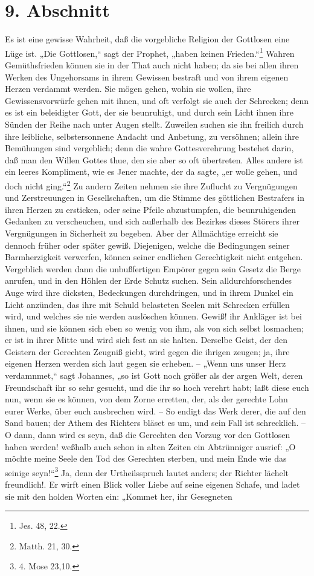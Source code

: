 \section{9. Abschnitt}

Es ist eine gewisse Wahrheit, daß die vorgebliche Religion der Gottlosen eine Lüge ist. „Die Gottlosen,“ sagt der Prophet, „haben keinen Frieden.“\footnote{Jes. 48, 22.} Wahren Gemüthsfrieden können sie in der That auch nicht haben; da sie bei allen ihren Werken des Ungehorsams in ihrem Gewissen bestraft und von ihrem eigenen Herzen verdammt werden. Sie mögen gehen, wohin sie wollen, ihre Gewissensvorwürfe gehen mit ihnen, und oft verfolgt sie auch der Schrecken; denn es ist ein beleidigter Gott, der sie beunruhigt, und durch sein Licht ihnen ihre Sünden der Reihe nach unter Augen stellt. Zuweilen suchen sie ihn freilich durch ihre leibliche, selbstersonnene Andacht und Anbetung, zu versöhnen; allein ihre Bemühungen sind vergeblich; denn die wahre Gottesverehrung bestehet darin, daß man den Willen Gottes thue, den sie aber so oft übertreten. Alles andere ist ein leeres Kompliment, wie es Jener machte, der da sagte, „er wolle gehen, und doch nicht ging.“\footnote{Matth. 21, 30.} Zu andern Zeiten nehmen sie ihre Zuflucht zu Vergnügungen und Zerstreuungen in Gesellschaften, um die Stimme des göttlichen Bestrafers in ihren Herzen zu ersticken, oder seine Pfeile abzustumpfen, die beunruhigenden Gedanken zu verscheuchen, und sich außerhalb des Bezirkes dieses Störers ihrer Vergnügungen in Sicherheit zu begeben. Aber der Allmächtige erreicht sie dennoch früher oder später gewiß. Diejenigen, welche die Bedingungen seiner Barmherzigkeit verwerfen, können seiner endlichen Gerechtigkeit nicht entgehen. Vergeblich werden dann die unbußfertigen Empörer gegen sein Gesetz die Berge anrufen, und in den Höhlen der Erde Schutz suchen. Sein alldurchforschendes Auge wird ihre dicksten, Bedeckungen durchdringen, und in ihrem Dunkel ein Licht anzünden, das ihre mit Schuld belasteten Seelen mit Schrecken erfüllen wird, und welches sie nie werden auslöschen können. Gewiß! ihr Ankläger ist bei ihnen, und sie können sich eben so wenig von ihm, als von sich selbst losmachen; er ist in ihrer Mitte und wird sich fest an sie halten. Derselbe Geist, der den Geistern der Gerechten Zeugniß giebt, wird gegen die ihrigen zeugen; ja, ihre eigenen Herzen werden sich laut gegen sie erheben. – „Wenn uns unser Herz verdamnmet,“ sagt Johannes, „so ist Gott noch größer als der argen Welt, deren Freundschaft ihr so sehr gesucht, und die ihr so hoch verehrt habt; laßt diese euch nun, wenn sie es können, von dem Zorne erretten, der, als der gerechte Lohn eurer Werke, über euch ausbrechen wird. – So endigt das Werk derer, die auf den Sand bauen; der Athem des Richters bläset es um, und sein Fall ist schrecklich. – O dann, dann wird es seyn, daß die Gerechten den Vorzug vor den Gottlosen haben werden! weßhalb auch schon in alten Zeiten ein Abtrünniger ausrief: „O möchte meine Seele den Tod des Gerechten sterben, und mein Ende wie das seinige seyn!“\footnote{4. Mose 23,10.} Ja, denn der Urtheilsspruch lautet anders; der Richter lächelt freundlich!. Er wirft einen Blick voller Liebe auf seine eigenen Schafe, und ladet sie mit den holden Worten ein: „Kommet her, ihr Gesegneten 